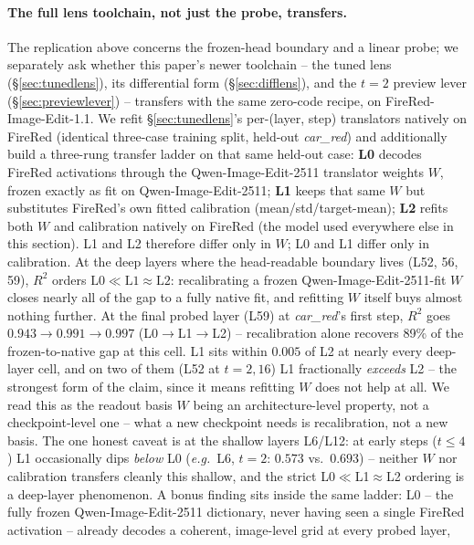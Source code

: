 \documentclass[10pt,twocolumn]{article}
\newcommand{\model}{Qwen-Image-Edit-2511}
\begin{document}
\paragraph{The full lens toolchain, not just the probe, transfers.} The
replication above concerns the frozen-head boundary and a linear probe;
we separately ask whether this paper's newer toolchain -- the tuned
lens (\S\ref{sec:tunedlens}), its differential form
(\S\ref{sec:difflens}), and the $t{=}2$ preview lever
(\S\ref{sec:previewlever}) -- transfers with the same zero-code recipe,
on FireRed-Image-Edit-1.1. We refit \S\ref{sec:tunedlens}'s
per-(layer, step) translators natively on FireRed (identical
three-case training split, held-out \emph{car\_red}) and additionally
build a three-rung transfer ladder on that same held-out case:
\textbf{L0} decodes FireRed activations through the \model{} translator
weights $W$, frozen exactly as fit on \model{}; \textbf{L1} keeps that
same $W$ but substitutes FireRed's own fitted calibration
(mean/std/target-mean); \textbf{L2} refits both $W$ and calibration
natively on FireRed (the model used everywhere else in this section).
L1 and L2 therefore differ only in $W$; L0 and L1 differ only in
calibration. At the deep layers where the head-readable boundary lives
(L52, 56, 59), $R^2$ orders $\text{L0} \ll \text{L1} \approx \text{L2}$:
recalibrating a frozen \model{}-fit $W$ closes nearly all of the gap to
a fully native fit, and refitting $W$ itself buys almost nothing
further. At the final probed layer (L59) at \emph{car\_red}'s first step,
$R^2$ goes $0.943 \to 0.991 \to 0.997$ (L0$\to$L1$\to$L2) -- recalibration alone
recovers 89\% of the frozen-to-native gap at this cell. L1 sits
within $0.005$ of L2 at nearly every deep-layer cell, and on two of them
(L52 at $t{=}2, 16$) L1 fractionally \emph{exceeds} L2 -- the strongest
form of the claim, since it means refitting $W$ does not help at all.
We read this as the readout basis $W$ being an architecture-level
property, not a checkpoint-level one -- what a new checkpoint needs is
recalibration, not a new basis. The one honest caveat is at the
shallow layers L6/L12: at early steps ($t\le4$) L1 occasionally dips
\emph{below} L0 (\emph{e.g.}\ L6, $t{=}2$: $0.573$ vs.\ $0.693$) --
neither $W$ nor calibration transfers cleanly this shallow, and the
strict L0$\ll$L1$\approx$L2 ordering is a deep-layer phenomenon. A
bonus finding sits inside the same ladder: L0 -- the fully frozen
\model{} dictionary, never having seen a single FireRed activation --
already decodes a coherent, image-level grid at every probed layer,
\end{document}
